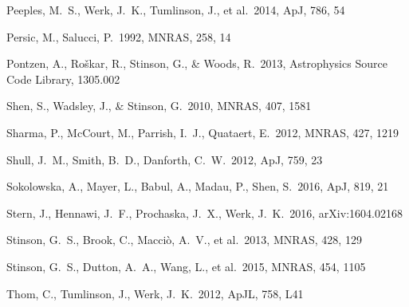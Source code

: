 \documentclass[useAMS,usenatbib]{mn2e}
\def \apj {ApJ}
\def \apjl {ApJL}
\def \mnras {MNRAS}
\begin{document}
\begin{thebibliography}{}
 Peeples, M.~S., Werk, J.~K., Tumlinson, J., et al.\ 2014, \apj, 786, 54

 Persic, M., Salucci, P.\ 1992, \mnras, 258, 14

 Pontzen, A., Ro{\v s}kar, R., Stinson, G., \& Woods, R.\ 2013, Astrophysics Source Code Library, 1305.002 





 Shen, S., Wadsley, J., 
\& Stinson, G.\ 2010, \mnras, 407, 1581 

Sharma, P., McCourt, M., Parrish, I.~J., Quataert, E.\ 2012, \mnras, 427, 1219

Shull, J.~M., Smith, B.~D., Danforth, C.~W.\ 2012, \apj, 759, 23

Sokolowska, A., Mayer, L., Babul, A., Madau, P., Shen, S.\ 2016, \apj, 819, 21

Stern, J., Hennawi, J.~F., Prochaska, J.~X., Werk, J.~K.\ 2016, arXiv:1604.02168

 Stinson, G.~S., Brook, 
C., Macci{\`o}, A.~V., et al.\ 2013, \mnras, 428, 129 

 Stinson, G.~S., Dutton, A.~A., Wang, L., et al.\ 2015, \mnras, 454, 1105 



Thom, C., Tumlinson, J., Werk, J.~K.\ 2012, \apjl, 758, L41


\end{thebibliography}
\end{document}
